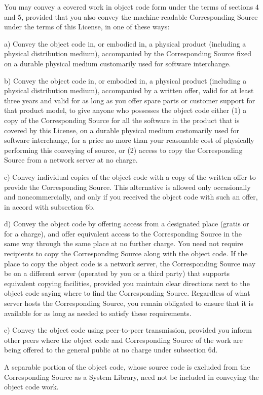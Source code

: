 You may convey a covered work in object code form under the terms of sections 4 and 5, provided that you also convey the machine-\/readable Corresponding Source under the terms of this License, in one of these ways\+: \begin{DoxyVerb}a) Convey the object code in, or embodied in, a physical product
(including a physical distribution medium), accompanied by the
Corresponding Source fixed on a durable physical medium
customarily used for software interchange.

b) Convey the object code in, or embodied in, a physical product
(including a physical distribution medium), accompanied by a
written offer, valid for at least three years and valid for as
long as you offer spare parts or customer support for that product
model, to give anyone who possesses the object code either (1) a
copy of the Corresponding Source for all the software in the
product that is covered by this License, on a durable physical
medium customarily used for software interchange, for a price no
more than your reasonable cost of physically performing this
conveying of source, or (2) access to copy the
Corresponding Source from a network server at no charge.

c) Convey individual copies of the object code with a copy of the
written offer to provide the Corresponding Source.  This
alternative is allowed only occasionally and noncommercially, and
only if you received the object code with such an offer, in accord
with subsection 6b.

d) Convey the object code by offering access from a designated
place (gratis or for a charge), and offer equivalent access to the
Corresponding Source in the same way through the same place at no
further charge.  You need not require recipients to copy the
Corresponding Source along with the object code.  If the place to
copy the object code is a network server, the Corresponding Source
may be on a different server (operated by you or a third party)
that supports equivalent copying facilities, provided you maintain
clear directions next to the object code saying where to find the
Corresponding Source.  Regardless of what server hosts the
Corresponding Source, you remain obligated to ensure that it is
available for as long as needed to satisfy these requirements.

e) Convey the object code using peer-to-peer transmission, provided
you inform other peers where the object code and Corresponding
Source of the work are being offered to the general public at no
charge under subsection 6d.
\end{DoxyVerb}
 A separable portion of the object code, whose source code is excluded from the Corresponding Source as a System Library, need not be included in conveying the object code work.

